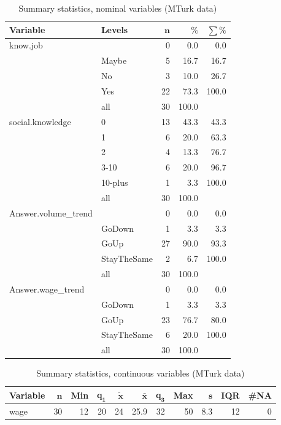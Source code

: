 \documentclass[a4paper,10pt]{article}\usepackage[]{graphicx}\usepackage[]{color}
\begin{document}
\begin{table}[ht]
\centering
{\footnotesize
\begin{tabular}{ll|rrr}
 \textbf{Variable} & \textbf{Levels} & $\mathbf{n}$ & $\mathbf{\%}$ & $\mathbf{\sum \%}$ \\ 
  \hline
know.job &  & 0 & 0.0 & 0.0 \\ 
   & Maybe & 5 & 16.7 & 16.7 \\ 
   & No & 3 & 10.0 & 26.7 \\ 
   & Yes & 22 & 73.3 & 100.0 \\ 
   \hline
 & all & 30 & 100.0 &  \\ 
   \hline
\hline
social.knowledge & 0 & 13 & 43.3 & 43.3 \\ 
   & 1 & 6 & 20.0 & 63.3 \\ 
   & 2 & 4 & 13.3 & 76.7 \\ 
   & 3-10 & 6 & 20.0 & 96.7 \\ 
   & 10-plus & 1 & 3.3 & 100.0 \\ 
   \hline
 & all & 30 & 100.0 &  \\ 
   \hline
\hline
Answer.volume\_trend &  & 0 & 0.0 & 0.0 \\ 
   & GoDown & 1 & 3.3 & 3.3 \\ 
   & GoUp & 27 & 90.0 & 93.3 \\ 
   & StayTheSame & 2 & 6.7 & 100.0 \\ 
   \hline
 & all & 30 & 100.0 &  \\ 
   \hline
\hline
Answer.wage\_trend &  & 0 & 0.0 & 0.0 \\ 
   & GoDown & 1 & 3.3 & 3.3 \\ 
   & GoUp & 23 & 76.7 & 80.0 \\ 
   & StayTheSame & 6 & 20.0 & 100.0 \\ 
   \hline
 & all & 30 & 100.0 &  \\ 
   \hline
\hline
\end{tabular}
}
\caption{Summary statistics, nominal variables (MTurk data)} 
\label{tab1:15-1120}
\end{table}
\begin{table}[ht]
\centering
{\footnotesize
\begin{tabular}{lrrrrrrrrrr}
 \textbf{Variable} & $\mathbf{n}$ & \textbf{Min} & $\mathbf{q_1}$ & $\mathbf{\widetilde{x}}$ & $\mathbf{\bar{x}}$ & $\mathbf{q_3}$ & \textbf{Max} & $\mathbf{s}$ & \textbf{IQR} & \textbf{\#NA} \\ 
  \hline
wage & 30 & 12 & 20 & 24 & 25.9 & 32 & 50 & 8.3 & 12 & 0 \\ 
  \end{tabular}
}
\caption{Summary statistics, continuous variables (MTurk data)} 
\label{tab2:15-1120}
\end{table}
\end{document}
